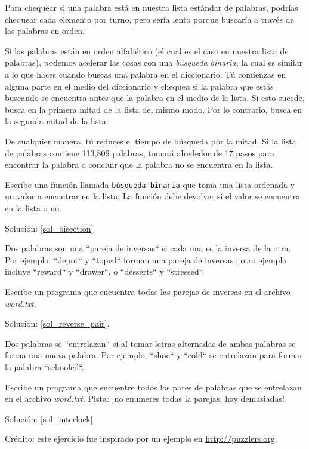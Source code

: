 \begin{exercise}
\label{bisection}

Para chequear si una palabra está en nuestra lista 
estándar de palabras, podrías chequear cada elemento
por turno, pero sería lento porque buscaría a través 
de las palabras en orden.

Si las palabras están en orden alfabético (el cual es
el caso en nuestra lista de palabras), podemos 
acelerar las cosas con una \emph{búsqueda binaria},
la cual es similar a lo que haces cuando buscas una
palabra en el diccionario. Tú comienzas en alguna parte
en el medio del diccionario y chequea si la palabra que
estás buscando se encuentra antes que la palabra en
el medio de la lista. Si esto sucede, busca en la 
primera mitad de la lista del mismo modo. Por lo
contrario, busca en la segunda mitad de la lista.

De cualquier manera, tú reduces el tiempo de búsqueda
por la mitad. Si la lista de palabras contiene 113,809 
palabras, tomará alrededor de 17 pasos para encontrar la 
palabra o concluir que la palabra no se encuentra en 
la lista.

Escribe una función llamada \verb|búsqueda-binaria|
que toma una lista ordenada y un valor a encontrar en
la lista. La función debe devolver si el valor
se encuentra en la lista o no.

Solución: \ref{sol_bisection}

\end{exercise}

\begin{exercise}
\label{reverse_pair}

Dos palabras son una ``pareja de inversas`` si cada una es la
inversa de la otra. Por ejemplo, ``depot`` y ``toped`` forman
una pareja de inversas.; otro ejemplo incluye ``reward`` y ``drawer``,
o ``desserts`` y ``stressed``.

Escribe un programa que encuentra todas las parejas de inversas en 
el archivo \emph{word.txt}.


Solución: \ref{sol_reverse_pair}.

\end{exercise}

\begin{exercise}
\label{interlock}

Dos palabras se ``entrelazan`` si al tomar letras alternadas de
ambas palabras se forma una nueva palabra. Por ejemplo, ``shoe``
y ``cold`` se entrelazan para formar la palabra ``schooled``.

Escribe un programa que encuentre todos los pares de palabras
que se entrelazan en el archivo \emph{word.txt}.
Pista: ¡no enumeres todas la parejas, hay demasiadas!

Solución: \ref{sol_interlock}

Crédito: este ejercicio fue inspirado por un ejemplo en \url{http://puzzlers.org}.

\end{exercise}


